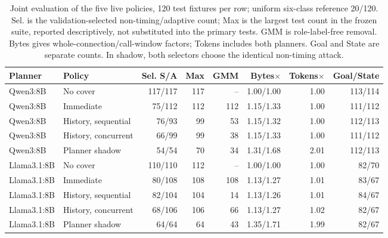 \begin{table}[t]\centering\small
\caption{Joint evaluation of the five live policies, 120 test fixtures per row; uniform six-class reference 20/120. Sel. is the validation-selected non-timing/adaptive count; Max is the largest test count in the frozen suite, reported descriptively, not substituted into the primary tests. GMM is role-label-free removal. Bytes gives whole-connection/call-window factors; Tokens includes both planners. Goal and State are separate counts. In shadow, both selectors choose the identical non-timing attack.}\label{tab:live-timing-main}
\setlength{\tabcolsep}{4pt}
\begin{tabularx}{\textwidth}{@{}lYrrrrrr@{}}\toprule
Planner & Policy & Sel. S/A & Max & GMM & Bytes$\times$ & Tokens$\times$ & Goal/State \\\midrule

Qwen3:8B & No cover & 117/117 & 117 & -- & 1.00/1.00 & 1.00 & 113/114 \\
Qwen3:8B & Immediate & 75/112 & 112 & 112 & 1.15/1.33 & 1.00 & 111/112 \\
Qwen3:8B & History, sequential & 76/93 & 99 & 53 & 1.15/1.32 & 1.00 & 112/113 \\
Qwen3:8B & History, concurrent & 66/99 & 99 & 38 & 1.15/1.33 & 1.00 & 111/112 \\
Qwen3:8B & Planner shadow & 54/54 & 70 & 34 & 1.31/1.68 & 2.01 & 112/113 \\
Llama3.1:8B & No cover & 110/110 & 112 & -- & 1.00/1.00 & 1.00 & 82/70 \\
Llama3.1:8B & Immediate & 80/108 & 108 & 108 & 1.13/1.27 & 1.01 & 83/67 \\
Llama3.1:8B & History, sequential & 82/104 & 104 & 14 & 1.13/1.26 & 1.01 & 84/67 \\
Llama3.1:8B & History, concurrent & 68/106 & 106 & 66 & 1.13/1.27 & 1.02 & 82/67 \\
Llama3.1:8B & Planner shadow & 64/64 & 64 & 43 & 1.35/1.71 & 1.99 & 82/67 \\
\bottomrule\end{tabularx}\end{table}
